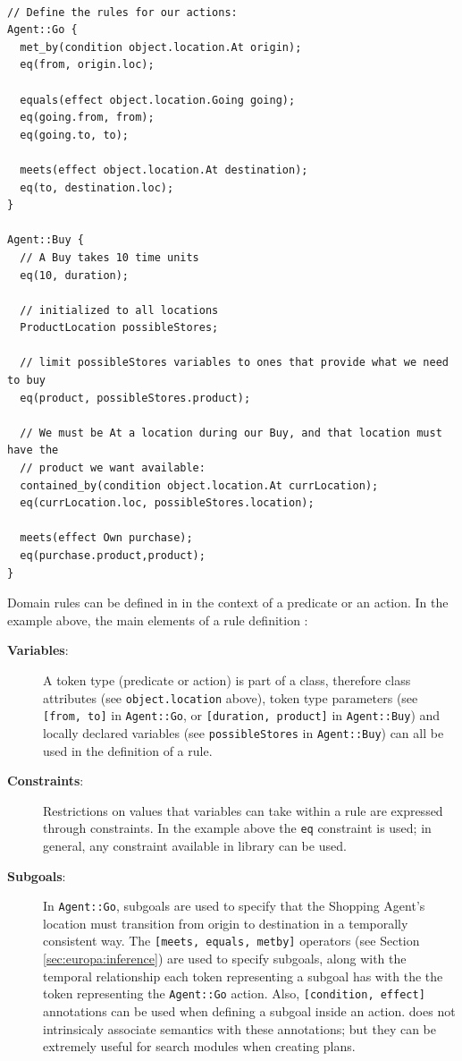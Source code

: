\begin{verbatim}

// Define the rules for our actions:
Agent::Go {
  met_by(condition object.location.At origin);
  eq(from, origin.loc);
 
  equals(effect object.location.Going going);
  eq(going.from, from);
  eq(going.to, to);
   
  meets(effect object.location.At destination);
  eq(to, destination.loc);
}

Agent::Buy {
  // A Buy takes 10 time units
  eq(10, duration);

  // initialized to all locations
  ProductLocation possibleStores;

  // limit possibleStores variables to ones that provide what we need to buy
  eq(product, possibleStores.product);

  // We must be At a location during our Buy, and that location must have the
  // product we want available:
  contained_by(condition object.location.At currLocation);
  eq(currLocation.loc, possibleStores.location);
  
  meets(effect Own purchase);
  eq(purchase.product,product);
}
\end{verbatim}

Domain rules can be defined in \nd in the context of a predicate or an
action. In the example above, the main elements of a rule definition
:

\begin{description}

\item[\textbf{Variables}:] A token type (predicate or action) is part
  of a class, therefore class attributes (see \texttt{object.location}
  above), token type parameters (see \texttt{[from, to]} in
  \texttt{Agent::Go}, or \texttt{[duration, product]} in
  \texttt{Agent::Buy}) and locally declared variables (see
  \texttt{possibleStores} in \texttt{Agent::Buy}) can all be used in
  the definition of a rule.

\item[\textbf{Constraints}:] Restrictions on values that variables can
  take within a rule are expressed through constraints. In the example
  above the \texttt{eq} constraint is used; in general, any constraint
  available in \eus library can be used.

\item[\textbf{Subgoals}:] In \texttt{Agent::Go}, subgoals are used to
  specify that the Shopping Agent's location must transition from
  origin to destination in a temporally consistent way. The
  \texttt{[meets, equals, metby]} operators (see Section
  \ref{sec:europa:inference}) are used to specify subgoals, along with
  the temporal relationship each token representing a subgoal has with
  the the token representing the \texttt{Agent::Go} action. Also,
  \texttt{[condition, effect]} annotations can be used when defining a
  subgoal inside an action. \eu does not intrinsicaly associate semantics
  with these annotations; but they can be extremely useful for search
  modules when creating plans.

\end{description}

